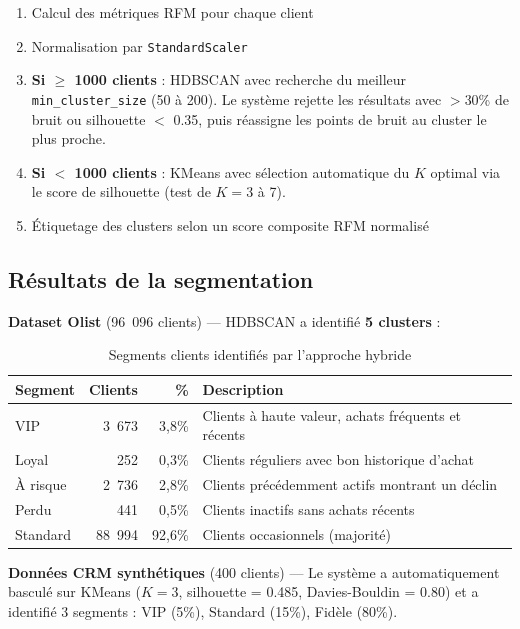 \documentclass[12pt,a4paper]{report}
\begin{document}
\begin{enumerate}
  \item Calcul des m\'{e}triques RFM pour chaque client
  \item Normalisation par \texttt{StandardScaler}
  \item \textbf{Si $\geq$ 1000 clients} : HDBSCAN avec recherche du meilleur \texttt{min\_cluster\_size} (50 \`{a} 200). Le syst\`{e}me rejette les r\'{e}sultats avec $>$30\% de bruit ou silhouette $<$ 0.35, puis r\'{e}assigne les points de bruit au cluster le plus proche.
  \item \textbf{Si $<$ 1000 clients} : KMeans avec s\'{e}lection automatique du $K$ optimal via le score de silhouette (test de $K=3$ \`{a} 7).
  \item \'{E}tiquetage des clusters selon un score composite RFM normalis\'{e}
\end{enumerate}

\subsection{R\'{e}sultats de la segmentation}

\textbf{Dataset Olist} (96~096 clients) — HDBSCAN a identifi\'{e} \textbf{5 clusters} :

\begin{table}[H]
\centering
\caption{Segments clients identifi\'{e}s par l'approche hybride}
\label{tab:segments}
\begin{tabularx}{\textwidth}{l r r X}
\toprule
\textbf{Segment} & \textbf{Clients} & \textbf{\%} & \textbf{Description} \\
\midrule
VIP & 3~673 & 3,8\% & Clients \`{a} haute valeur, achats fr\'{e}quents et r\'{e}cents \\
Loyal & 252 & 0,3\% & Clients r\'{e}guliers avec bon historique d'achat \\
\`{A} risque & 2~736 & 2,8\% & Clients pr\'{e}c\'{e}demment actifs montrant un d\'{e}clin \\
Perdu & 441 & 0,5\% & Clients inactifs sans achats r\'{e}cents \\
Standard & 88~994 & 92,6\% & Clients occasionnels (majorit\'{e}) \\
\bottomrule
\end{tabularx}
\end{table}

\textbf{Donn\'{e}es CRM synth\'{e}tiques} (400 clients) — Le syst\`{e}me a automatiquement bascul\'{e} sur KMeans ($K=3$, silhouette = 0.485, Davies-Bouldin = 0.80) et a identifi\'{e} 3 segments : VIP (5\%), Standard (15\%), Fid\`{e}le (80\%).
\end{document}
